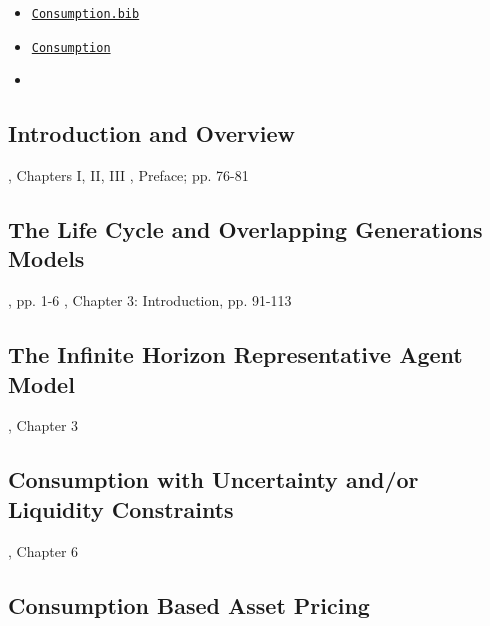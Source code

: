 
\begin{itemize}
\item[Bib:] \texttt{\href{http://www.econ2.jhu.edu/people/ccarroll/courses/Choice/Syllabus/Consumption.bib}{Consumption.bib}}
\item[Handouts:] \texttt{\href{https://intertemporal-choice.github.io/content/consumption}{Consumption}}
\item[Readings:]
\end{itemize}

\newcommand{\IntroC}{Introduction and Overview}
\subsection{\IntroC}\label{subsec:\IntroC}

\newcommand{\dt}{\cite{deatonUnderstandingC}}
\newcommand{\fr}{\cite{friedmanATheory}}
\bi
\reqd \fr, Chapters I, II, III
\reqd \dt, Preface; pp. 76-81
\ei

\subsection{The Life Cycle and Overlapping Generations Models}

\providecommand{\blf}{\cite{blanchard&fischer:text}}
\providecommand{\ro}{\cite{romer:text}}
\bi
\reqd \dt, pp. 1-6
\reqd \blf, Chapter 3: Introduction, pp. 91-113
\recm \cite{diamond:olg}
\recm \cite{feldstein:induced}
\reqd \cite{modigliani:nobel}
\recm \cite{summersCapTax}
\recm \cite{pemberton:failure}
\reqd \cite{carroll&summers:cparallelsy}
\ei

\subsection{The Infinite Horizon Representative Agent Model}

\bi
\reqd \dt, Chapter 3
\reqd \cite{hallRandomWalk}
\recm \cite{flavinSensitive}
\recm \cite{cdSmooth}
\reqd \cite{cmModel}
\recm \cite{hallSubstitution}
\recm \cite{cfwSentiment}
\ei

\subsection{Consumption with Uncertainty and/or Liquidity Constraints}

\bi
\reqd \dt, Chapter 6
\recm \cite{zeldes_jpe89}
\recm \cite{caballero:jme}
\recm \cite{deatonLiqConstr}
\recm \cite{toche:urisk}
\reqd \cite{carroll:atheorynberwp}
\reqd \cite{CarrollKimballPSPW}
\reqd \cite{carroll&summers:cparallelsy}
\recm \cite{BufferStockTheory}
\recm \cite{carroll:death}
\ei

\subsection{Consumption Based Asset Pricing}

\bi
\reqd \cite{lucas:assetpricing}
\reqd \cite{mehraPrescottPuzzle}
\recm \cite{blanchard:burstingbubbles}
\recm \cite{carrollIrrational}
\ei
